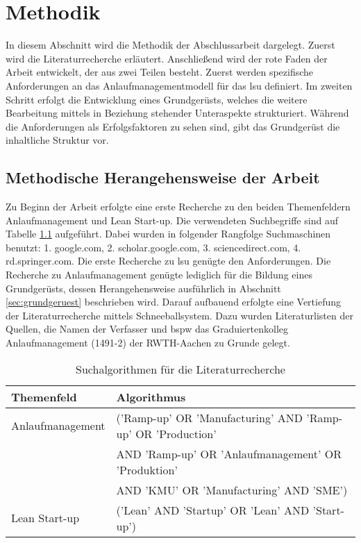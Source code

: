\chapter{Methodik}\label{sec:methodik}
In diesem Abschnitt wird die Methodik der Abschlussarbeit dargelegt. Zuerst wird die Literaturrecherche erläutert. Anschließend wird der rote Faden der Arbeit entwickelt, der aus zwei Teilen besteht. Zuerst werden spezifische Anforderungen an das Anlaufmanagementmodell für das \gls{lsu} definiert. Im zweiten Schritt erfolgt die Entwicklung eines Grundgerüsts, welches die weitere Bearbeitung mittels in Beziehung stehender Unteraspekte strukturiert. Während die Anforderungen als Erfolgsfaktoren zu sehen sind, gibt das Grundgerüst die inhaltliche Struktur vor.  


\section{Methodische Herangehensweise der Arbeit}

Zu Beginn der Arbeit erfolgte eine erste Recherche zu den beiden Themenfeldern Anlaufmanagement und Lean Start-up. Die verwendeten Suchbegriffe sind auf Tabelle \ref{tab:algorythm} aufgeführt. Dabei wurden in folgender Rangfolge Suchmaschinen benutzt: 
1. google.com, 2. scholar.google.com, 3. sciencedirect.com, 4. rd.springer.com. Die erste Recherche zu \gls{lsu} genügte den Anforderungen. Die Recherche zu Anlaufmanagement genügte lediglich für die Bildung eines Grundgerüsts, dessen Herangehensweise ausführlich in Abschnitt \ref{sec:grundgeruest} beschrieben wird. Darauf aufbauend erfolgte eine Vertiefung der Literaturrecherche mittels Schneeballsystem. Dazu wurden Literaturlisten der Quellen, die Namen der Verfasser und \gls{bspw} das Graduiertenkolleg Anlaufmanagement (1491-2) der RWTH-Aachen zu Grunde gelegt. 
\begin{table}[h]
\begin{center}
\begin{tabular}{l l}
\textbf{Themenfeld} & \textbf{Algorithmus }\\ \hline
Anlaufmanagement & ('Ramp-up' OR 'Manufacturing' AND 'Ramp-up' OR 'Production' \\ 
& AND 'Ramp-up' OR 'Anlaufmanagement' OR 'Produktion' \\
& AND 'KMU' OR 'Manufacturing' AND 'SME') \\
Lean Start-up & ('Lean' AND 'Startup' OR 'Lean' AND 'Start-up')
 \end{tabular} 
 \end{center}
\caption{Suchalgorithmen für die Literaturrecherche} \label{tab:algorythm} 
\end{table}

